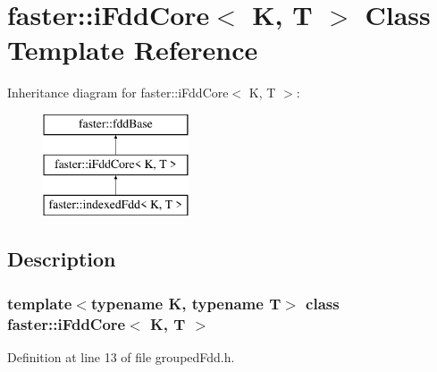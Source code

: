 \hypertarget{classfaster_1_1iFddCore}{}\section{faster\+:\+:i\+Fdd\+Core$<$ K, T $>$ Class Template Reference}
\label{classfaster_1_1iFddCore}
Inheritance diagram for faster\+:\+:i\+Fdd\+Core$<$ K, T $>$\+:\begin{figure}[H]
\begin{center}
\leavevmode
\includegraphics[height=3.000000cm]{classfaster_1_1iFddCore}
\end{center}
\end{figure}


\subsection{Description}
\subsubsection*{template$<$typename K, typename T$>$\newline
class faster\+::i\+Fdd\+Core$<$ K, T $>$}



Definition at line 13 of file grouped\+Fdd.\+h.

